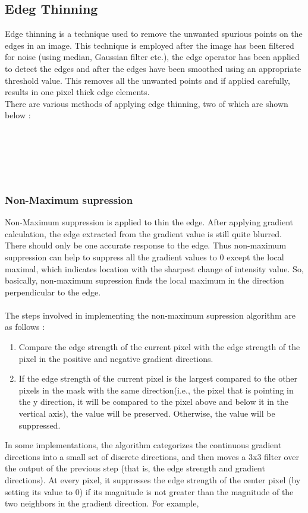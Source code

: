 \documentclass{article}
\begin{document}
	\subsection{Edeg Thinning}
		Edge thinning is a technique used to remove the unwanted spurious points on the edges in an image. This technique is employed after the image has been filtered for noise (using median, Gaussian filter etc.), the edge operator has been applied to detect the edges and after the edges have been smoothed using an appropriate threshold value. This removes all the unwanted points and if applied carefully, results in one pixel thick edge elements.\\
		There are various methods of applying edge thinning, two of which are shown below : \\ \\ \\ \\ \\ \\
		\subsubsection{Non-Maximum supression}
		Non-Maximum suppression is applied to thin the edge. After applying gradient calculation, the edge extracted from the gradient value is still quite blurred. There should only be one accurate response to the edge. Thus non-maximum suppression can help to suppress all the gradient values to 0 except the local maximal, which indicates location with the sharpest change of intensity value. So, basically, non-maximum supression finds the local maximum in the direction perpendicular to the edge.

		\paragraph{}
		The steps involved in implementing the non-maximum supression algorithm are as follows : 
		\begin{enumerate}
			\item Compare the edge strength of the current pixel with the edge strength of the pixel in the positive and negative gradient directions.

			\item If the edge strength of the current pixel is the largest compared to the other pixels in the mask with the same direction(i.e., the pixel that is pointing in the y direction, it will be compared to the pixel above and below it in the vertical axis), the value will be preserved. Otherwise, the value will be suppressed.

		\end{enumerate}
		In some implementations, the algorithm categorizes the continuous gradient directions into a small set of discrete directions, and then moves a 3x3 filter over the output of the previous step (that is, the edge strength and gradient directions). At every pixel, it suppresses the edge strength of the center pixel (by setting its value to 0) if its magnitude is not greater than the magnitude of the two neighbors in the gradient direction. For example,
\end{document}
